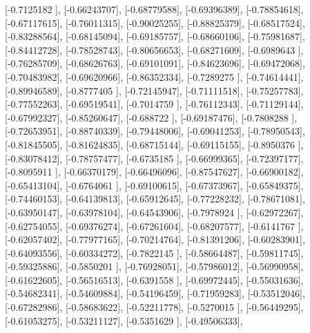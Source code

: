 \documentclass{article}
\begin{document}
       [-0.7125182 ],
       [-0.66243707],
       [-0.68779588],
       [-0.69396389],
       [-0.78854618],
       [-0.67117615],
       [-0.76011315],
       [-0.90025255],
       [-0.88825379],
       [-0.68517524],
       [-0.83288564],
       [-0.68145094],
       [-0.69185757],
       [-0.68660106],
       [-0.75981687],
       [-0.84412728],
       [-0.78528743],
       [-0.80656653],
       [-0.68271609],
       [-0.6989643 ],
       [-0.76285709],
       [-0.68626763],
       [-0.69101091],
       [-0.84623696],
       [-0.69472068],
       [-0.70483982],
       [-0.69620966],
       [-0.86352334],
       [-0.7289275 ],
       [-0.74614441],
       [-0.89946589],
       [-0.8777405 ],
       [-0.72145947],
       [-0.71111518],
       [-0.75257783],
       [-0.77552263],
       [-0.69519541],
       [-0.7014759 ],
       [-0.76112343],
       [-0.71129144],
       [-0.67992327],
       [-0.85260647],
       [-0.688722  ],
       [-0.69187476],
       [-0.7808288 ],
       [-0.72653951],
       [-0.88740339],
       [-0.79448006],
       [-0.69041253],
       [-0.78950543],
       [-0.81845505],
       [-0.81624835],
       [-0.68715144],
       [-0.69115155],
       [-0.8950376 ],
       [-0.83078412],
       [-0.78757477],
       [-0.6735185 ],
       [-0.66999365],
       [-0.72397177],
       [-0.8095911 ],
       [-0.66370179],
       [-0.66496096],
       [-0.87547627],
       [-0.66900182],
       [-0.65413104],
       [-0.6764061 ],
       [-0.69100615],
       [-0.67373967],
       [-0.65849375],
       [-0.74460153],
       [-0.64139813],
       [-0.65912645],
       [-0.77228232],
       [-0.78671081],
       [-0.63950147],
       [-0.63978104],
       [-0.64543906],
       [-0.7978924 ],
       [-0.62972267],
       [-0.62754055],
       [-0.69376274],
       [-0.67261604],
       [-0.68207577],
       [-0.6141767 ],
       [-0.62057402],
       [-0.77977165],
       [-0.70214764],
       [-0.81391206],
       [-0.60283901],
       [-0.64093556],
       [-0.60334272],
       [-0.7822145 ],
       [-0.58664487],
       [-0.59811745],
       [-0.59325886],
       [-0.5850201 ],
       [-0.76928051],
       [-0.57986012],
       [-0.56990958],
       [-0.61622605],
       [-0.56516513],
       [-0.6391558 ],
       [-0.69972445],
       [-0.55031636],
       [-0.54682341],
       [-0.54609884],
       [-0.54196459],
       [-0.71959283],
       [-0.53512046],
       [-0.67282986],
       [-0.58683622],
       [-0.52211778],
       [-0.5270015 ],
       [-0.56449295],
       [-0.61053275],
       [-0.53211127],
       [-0.5351629 ],
       [-0.49506333],
\end{document}
